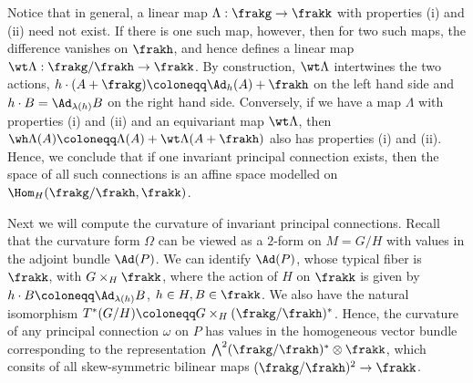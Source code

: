 \begin{rem}
    Notice that in general, a linear map $\Lambda:\frakg\to \frakk$ with properties (i) and (ii) need not exist. If there is one such map, however, then for two such maps, the difference vanishes on $\frakh$, and hence defines a linear map $\wt\Lambda:\frakg\slash\frakh\to \frakk$. By construction, $\wt\Lambda$ intertwines the two actions, $h\cdot (A+\frakg)\coloneqq \Ad_h(A)+\frakh$ on the left hand side and $h\cdot B=\Ad_{\lambda(h)}B$ on the right hand side. Conversely, if we have a map $\Lambda$ with properties (i) and (ii) and an equivariant map $\wt\Lambda$, then $\wh\Lambda(A)\coloneqq \Lambda(A)+\wt\Lambda(A+\frakh)$ also has properties (i) and (ii). Hence, we conclude that if one invariant principal connection exists, then the space of all such connections is an affine space modelled on $\Hom_H(\frakg\slash\frakh,\frakk)$.
\end{rem}



Next we will compute the curvature of invariant principal connections. Recall that the curvature form $\Omega$ can be viewed as a $2$-form on $M=G\slash H$ with values in the adjoint bundle $\Ad(P)$. We can identify $\Ad(P)$, whose typical fiber is $\frakk$, with $G\times_H \frakk$, where the action of $H$ on $\frakk$ is given by $h\cdot B\coloneqq \Ad_{\lambda(h)}B$, $h\in H, B\in\frakk$. We also have the natural isomorphism $T^\ast(G\slash H)\coloneqq G\times_H (\frakg\slash\frakh)^\ast$. Hence, the curvature of any principal connection $\omega$ on $P$ has values in the homogeneous vector bundle corresponding to the representation $\bigwedge^2(\frakg\slash\frakh)^\ast\otimes\frakk$, which consits of all skew-symmetric bilinear maps $(\frakg\slash\frakh)^2\to\frakk$. 

